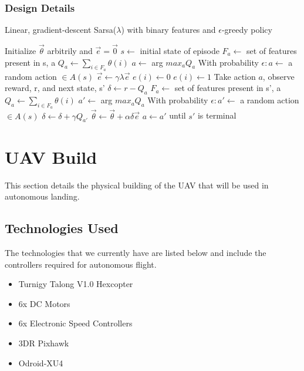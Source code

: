 \subsubsection{Design Details}
\begin{algorithm} [h]                     %
\caption{Linear, gradient-descent Sarsa($\lambda$) with binary features and $\epsilon$-greedy policy}         
\label{Sarsa}                           %
\begin{algorithmic}                  %
    \STATE Initialize $\vec{\theta}$ arbitrily and $\vec{e} = \vec{0}$
      \STATE $s \leftarrow$ initial state of episode
        \STATE $F_a \leftarrow$ set of features present in s, a
        \STATE $Q_a \leftarrow \sum_{i \in F_a}\theta(i)$
      \ENDFOR
      \STATE $a \leftarrow$ arg $max_a Q_a$
      \STATE With probability $\epsilon: a \leftarrow$ a random action $\in A(s)$
        \STATE $\vec{e} \leftarrow \gamma \lambda \vec{e}$
            \STATE $e(i) \leftarrow 0 $
          \ENDFOR
        \ENDFOR
          \STATE $e(i) \leftarrow 1 $
        \ENDFOR
        \STATE Take action $a$, observe reward, r, and next state, s'
        \STATE $\delta \leftarrow r - Q_a$
          \STATE $F_a \leftarrow$ set of features present in s', a
          \STATE $Q_a \leftarrow \sum_{i \in F_a}\theta(i)$
        \ENDFOR
        \STATE $a' \leftarrow$ arg $max_a Q_a$
        \STATE With probability $\epsilon:a' \leftarrow$ a random action $\in A(s)$
        \STATE $\delta \leftarrow \delta + \gamma Q_{a'}$
        \STATE $\vec{\theta} \leftarrow \vec{\theta} + \alpha \delta \vec{e}$
        \STATE $a \leftarrow a'$
      \ENDFOR
      \STATE until $s'$ is terminal
    \ENDFOR
\end{algorithmic}
\end{algorithm} 

\newpage
\section{UAV Build}
This section details the physical building of the UAV that will be used in autonomous landing.
\subsection{Technologies  Used}
The technologies that we currently have are listed below and include the controllers required for autonomous flight.
\begin{itemize}
	\item Turnigy Talong V1.0 Hexcopter
	\item 6x DC Motors
	\item 6x Electronic Speed Controllers
	\item 3DR Pixhawk
	\item Odroid-XU4
\end{itemize}
